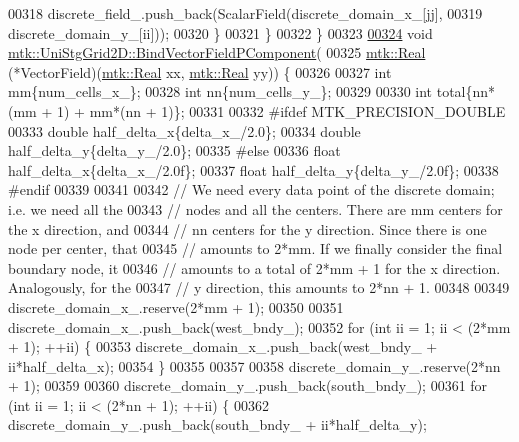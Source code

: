 \begin{DoxyCode}
00318       discrete\_field\_.push\_back(ScalarField(discrete\_domain\_x\_[jj],
00319                                             discrete\_domain\_y\_[ii]));
00320     \}
00321   \}
00322 \}
00323 
\hypertarget{mtk__uni__stg__grid__2d_8cc_source_l00324}{}\hyperlink{classmtk_1_1UniStgGrid2D_a5ff685fde27134437dd0b372fb6b9958}{00324} \textcolor{keywordtype}{void} \hyperlink{classmtk_1_1UniStgGrid2D_a5ff685fde27134437dd0b372fb6b9958}{mtk::UniStgGrid2D::BindVectorFieldPComponent}(
00325   \hyperlink{group__c01-roots_gac080bbbf5cbb5502c9f00405f894857d}{mtk::Real} (*VectorField)(\hyperlink{group__c01-roots_gac080bbbf5cbb5502c9f00405f894857d}{mtk::Real} xx, \hyperlink{group__c01-roots_gac080bbbf5cbb5502c9f00405f894857d}{mtk::Real} yy)) \{
00326 
00327   \textcolor{keywordtype}{int} mm\{num\_cells\_x\_\};
00328   \textcolor{keywordtype}{int} nn\{num\_cells\_y\_\};
00329 
00330   \textcolor{keywordtype}{int} total\{nn*(mm + 1) + mm*(nn + 1)\};
00331 
00332 \textcolor{preprocessor}{  #ifdef MTK\_PRECISION\_DOUBLE}
00333   \textcolor{keywordtype}{double} half\_delta\_x\{delta\_x\_/2.0\};
00334   \textcolor{keywordtype}{double} half\_delta\_y\{delta\_y\_/2.0\};
00335 \textcolor{preprocessor}{  #else}
00336   \textcolor{keywordtype}{float} half\_delta\_x\{delta\_x\_/2.0f\};
00337   \textcolor{keywordtype}{float} half\_delta\_y\{delta\_y\_/2.0f\};
00338 \textcolor{preprocessor}{  #endif}
00339 
00341 
00342   \textcolor{comment}{// We need every data point of the discrete domain; i.e. we need all the}
00343   \textcolor{comment}{// nodes and all the centers. There are mm centers for the x direction, and}
00344   \textcolor{comment}{// nn centers for the y direction. Since there is one node per center, that}
00345   \textcolor{comment}{// amounts to 2*mm. If we finally consider the final boundary node, it}
00346   \textcolor{comment}{// amounts to a total of 2*mm + 1 for the x direction. Analogously, for the}
00347   \textcolor{comment}{// y direction, this amounts to 2*nn + 1.}
00348 
00349   discrete\_domain\_x\_.reserve(2*mm + 1);
00350 
00351   discrete\_domain\_x\_.push\_back(west\_bndy\_);
00352   \textcolor{keywordflow}{for} (\textcolor{keywordtype}{int} ii = 1; ii < (2*mm + 1); ++ii) \{
00353     discrete\_domain\_x\_.push\_back(west\_bndy\_ + ii*half\_delta\_x);
00354   \}
00355 
00357 
00358   discrete\_domain\_y\_.reserve(2*nn + 1);
00359 
00360   discrete\_domain\_y\_.push\_back(south\_bndy\_);
00361   \textcolor{keywordflow}{for} (\textcolor{keywordtype}{int} ii = 1; ii < (2*nn + 1); ++ii) \{
00362     discrete\_domain\_y\_.push\_back(south\_bndy\_ + ii*half\_delta\_y);

\end{DoxyCode}
